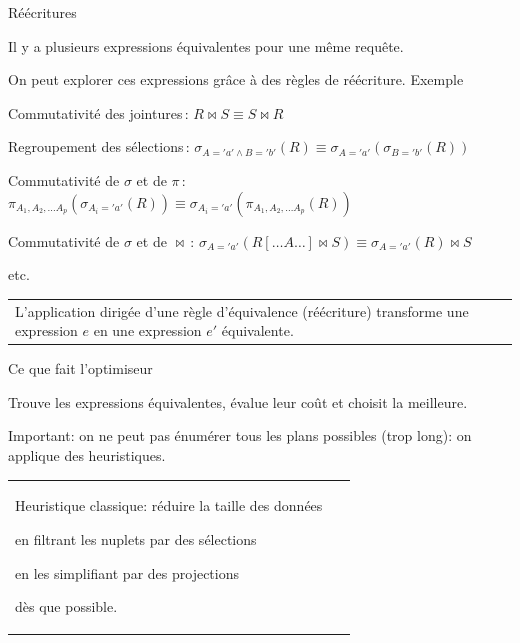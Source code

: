 \begin{frame}{Réécritures}

Il y a plusieurs expressions
\alert{équivalentes} pour une même requête. 

\smallskip

On peut explorer ces expressions grâce à des règles de réécriture.
Exemple


\begin{redlist}
\item \alert{Commutativité des jointures}\,:        $ R \Join S  \equiv S \Join R$

\item \alert{Regroupement des sélections}\,: 
        $\sigma_{A='a' \wedge B='b'}(R) \equiv
        \sigma_{A='a'}(\sigma_{B='b'}(R))$
        
\item \alert{Commutativité de $\sigma$ et de $\pi$}\,: 
        $\pi_{A_1, A_2, \ldots A_p}(\sigma_{A_i='a'} (R)) \equiv
        \sigma_{A_i='a'}(\pi_{A_1, A_2, \ldots A_p}(R))$

        \item \alert{Commutativité de $\sigma$ et de $\Join$}\,: 
$\sigma_{A='a'} (R[\ldots A\ldots] \Join S) \equiv
     \sigma_{A='a'}(R) \Join S$
\item etc.
\end{redlist}

\vfill



\begin{tabular}{p{9cm}p{5cm}}
L'application dirigée d'une règle d'équivalence (réécriture)
transforme une expression $e$ 
en une expression $e'$ \alert{équivalente}.
&
~
\end{tabular}

\end{frame}


\begin{frame}{Ce que fait l'optimiseur}

Trouve les expressions équivalentes, 
évalue leur coût et choisit la meilleure.

\vfill
\alert{Important}:
on ne peut pas \alert{énumérer} tous les plans possibles (trop long):
on applique des \alert{heuristiques}. 

\vfill

\begin{tabular}{p{9cm}p{5cm}}
Heuristique classique: \alert{réduire la taille
des données}
\begin{redbullet}
\item en filtrant les nuplets par
 des sélections
 \item en les simplifiant par des projections
\end{redbullet}
\alert{dès que possible.}
&
~
\end{tabular}

\end{frame}




